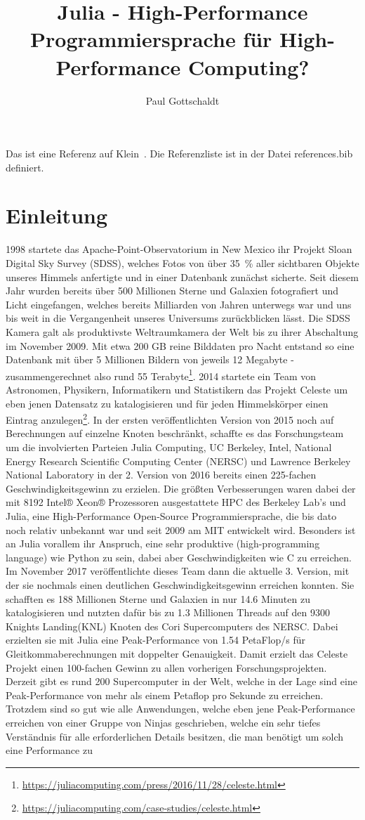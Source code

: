 \documentclass[proseminar,german,utf8]{zihpub}
\author{Paul Gottschaldt}
\title{Julia - High-Performance Programmiersprache für High-Performance Computing?}
\begin{document}
Das ist eine Referenz auf Klein~\cite{blackholes}. Die Referenzliste ist in der Datei references.bib definiert.

\section {Einleitung}
1998 startete das Apache-Point-Observatorium in New Mexico ihr Projekt Sloan Digital Sky Survey (SDSS), welches Fotos von über 35~\% aller sichtbaren Objekte unseres Himmels anfertigte und in einer Datenbank zunächst sicherte. Seit diesem Jahr wurden bereits über 500 Millionen Sterne und Galaxien fotografiert und Licht eingefangen, welches bereits Milliarden von Jahren unterwegs war und uns bis weit in die Vergangenheit unseres Universums zurückblicken lässt. Die SDSS Kamera galt als produktivste Weltraumkamera der Welt bis zu ihrer Abschaltung im November 2009. Mit etwa 200 GB reine Bilddaten pro Nacht entstand so eine Datenbank mit über 5 Millionen Bildern von jeweils 12 Megabyte - zusammengerechnet also rund 55 Terabyte\footnote{\url{https://juliacomputing.com/press/2016/11/28/celeste.html}}. 2014 startete ein Team von Astronomen, Physikern, Informatikern und Statistikern das Projekt Celeste um eben jenen Datensatz zu katalogisieren und für jeden Himmelskörper einen Eintrag anzulegen\footnote{\url{https://juliacomputing.com/case-studies/celeste.html}}. In der ersten veröffentlichten Version von 2015 noch auf Berechnungen auf einzelne Knoten beschränkt, schaffte es das Forschungsteam um die involvierten Parteien Julia Computing, UC Berkeley, Intel, National Energy Research Scientific Computing Center (NERSC) und Lawrence Berkeley National Laboratory in der 2. Version von 2016 bereits einen 225-fachen Geschwindigkeitsgewinn zu erzielen. Die größten Verbesserungen waren dabei der mit 8192 Intel® Xeon® Prozessoren ausgestattete HPC des Berkeley Lab's und Julia, eine High-Performance Open-Source Programmiersprache, die bis dato noch relativ unbekannt war und seit 2009 am MIT entwickelt wird. Besonders ist an Julia vorallem ihr Anspruch, eine sehr produktive (high-programming language) wie Python zu sein, dabei aber Geschwindigkeiten wie C zu erreichen. Im November 2017 veröffentlichte dieses Team dann die aktuelle 3. Version, mit der sie nochmals einen deutlichen Geschwindigkeitsgewinn erreichen konnten. Sie schafften es 188 Millionen Sterne und Galaxien in nur 14.6 Minuten zu katalogisieren und nutzten dafür bis zu 1.3 Millionen Threads auf den 9300 Knights Landing(KNL) Knoten des Cori Supercomputers des NERSC. Dabei erzielten sie mit Julia eine Peak-Performance von 1.54 PetaFlop/s für Gleitkommaberechnungen mit doppelter Genauigkeit. Damit erzielt das Celeste Projekt einen 100-fachen Gewinn zu allen vorherigen Forschungsprojekten. Derzeit gibt es rund 200 Supercomputer in der Welt, welche in der Lage sind eine Peak-Performance von mehr als einem Petaflop pro Sekunde zu erreichen. Trotzdem sind so gut wie alle Anwendungen, welche eben jene Peak-Performance erreichen von einer Gruppe von Ninjas geschrieben, welche ein sehr tiefes Verständnis für alle erforderlichen Details besitzen, die man benötigt um solch eine Performance zu 
\end{document}
